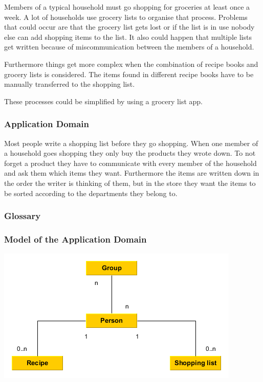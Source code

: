 \documentclass[12pt]{article}
\theoremstyle{definition}
\begin{document}
Members of a typical household must go shopping for groceries at least once a week. A lot of households use grocery lists to organise that process. Problems that could occur are that the grocery list gets lost or if the list is in use nobody else can add shopping items to the list. It also could happen that multiple lists get written because of miscommunication between the members of a household.

Furthermore things get more complex when the combination of recipe books and grocery lists is considered. The items found in different recipe books have to be manually transferred to the shopping list. 

These processes could be simplified by using a grocery list app.

\subsubsection{Application Domain}
Most people write a shopping list before they go shopping. When one member of a household goes shopping they only buy the products they wrote down. To not forget a product they have to communicate with every member of the household and ask them which items they want. Furthermore the items are written down in the order the writer is thinking of them, but in the store they want the items to be sorted according to the departments they belong to. 
\subsubsection{Glossary}

\subsubsection{Model of the Application Domain}

\includegraphics[scale=.5]{AppDomain.png}
\end{document}
